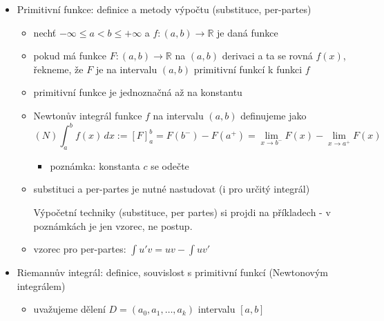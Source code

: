 \begin{itemize}
\begin{itemize}
\item Taylorův polynom řádu $n$ funkce $f$ v bodě $a$: \[T_n^{f,a}(x)=\sum_{i=0}^n\frac{f^{(i)}(a)}{i!}(x-a)^i\]
\begin{itemize}
\item poznámka: nultý člen součtu bude vždy $f(a)$
\end{itemize}
\item má-li funkce $f$ v bodě $a\in\mathbb R$ derivace všech řádů, rozumíme pro $x\in\mathbb R$ její taylorovou řadou se středem v $a$ řadu \[T^{f,a}(x)=\sum_{n=0}^\infty \frac{f^{(n)}(a)}{n!}(x-a)^n\]
\begin{itemize}
\item součet Taylorovy řady je $f(x)$
\end{itemize}
\end{itemize}
\item Primitivní funkce: definice a metody výpočtu (substituce, per-partes)
\begin{itemize}
\item nechť $-\infty\leq a\lt b\leq +\infty$ a $f:(a,b)\to\mathbb R$ je daná funkce
\item pokud má funkce $F:(a,b)\to\mathbb R$ na $(a,b)$ derivaci a ta se rovná $f(x)$, řekneme, že $F$ je na intervalu $(a,b)$ primitivní funkcí k funkci $f$
\item primitivní funkce je jednoznačná až na konstantu
\item Newtonův integrál funkce $f$ na intervalu $(a,b)$ definujeme jako \[(N)\int_a^bf(x)\,dx:=[F]_a^b=F(b^-)-F(a^+)=\lim_{x\to b^-}F(x)-\lim_{x\to a^+}F(x)\]
\begin{itemize}
\item poznámka: konstanta $c$ se odečte
\end{itemize}
\item substituci a per-partes je nutné nastudovat (i pro určitý integrál)
\begin{practicebox}
Výpočetní techniky (substituce, per partes) si projdi na příkladech - v poznámkách je jen vzorec, ne postup.
\end{practicebox}
\item vzorec pro per-partes: $\int u'v=uv-\int uv'$
\end{itemize}
\item Riemannův integrál: definice, souvislost s primitivní funkcí (Newtonovým integrálem)
\begin{itemize}
\item uvažujeme dělení $D=(a_0,a_1,\dots,a_k)$ intervalu $[a,b]$

\end{itemize}
\end{itemize}
